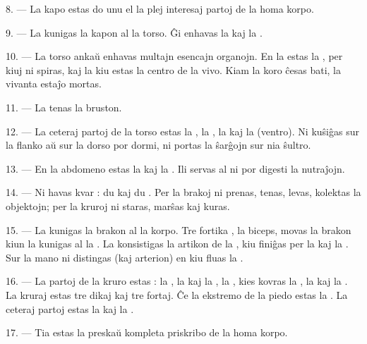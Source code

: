 8. --- La kapo estas do unu el la plej interesaj partoj de la homa korpo.

\VUsaut{4.4mm}
\VUsaut{3.0mm}

9. --- La  kunigas la kapon al la torso. Ĝi enhavas la
 kaj la .

10. --- La torso ankaŭ enhavas multajn esencajn organojn. En la 
estas la , per kiuj ni spiras, kaj la  kiu estas
la centro de la vivo. Kiam la koro ĉesas bati, la vivanta estaĵo mortas.

11. --- La  tenas la bruston.

12. --- La ceteraj partoj de la torso estas la , la
, la  kaj la  (ventro). Ni
kuŝiĝas sur la flanko aŭ sur la dorso por dormi, ni portas la ŝarĝojn sur nia
ŝultro.

13. --- En la abdomeno estas la  kaj la . Ili
servas al ni por digesti la nutraĵojn.

\VUsaut{4.4mm}
\VUsaut{3.0mm}

14. --- Ni havas kvar  : du  kaj du
. Per la brakoj ni prenas, tenas, levas, kolektas la objektojn;
per la kruroj ni staras, marŝas kaj kuras.

15. --- La  kunigas la brakon al la korpo. Tre fortika
, la biceps, movas la brakon kiun la  kunigas
al la . La  konsistigas la artikon de la
, kiu finiĝas per la  kaj la . Sur
la mano ni distingas  (kaj arterion) en kiu fluas la
.

16. --- La partoj de la kruro estas : la , la 
kaj la , la , kies  kovras la
, la  kaj la . La kruraj
 estas tre dikaj kaj tre fortaj. Ĉe la ekstremo de la piedo
estas la . La ceteraj partoj estas la  kaj
la .

17. --- Tia estas la preskaŭ kompleta priskribo de la homa korpo.

